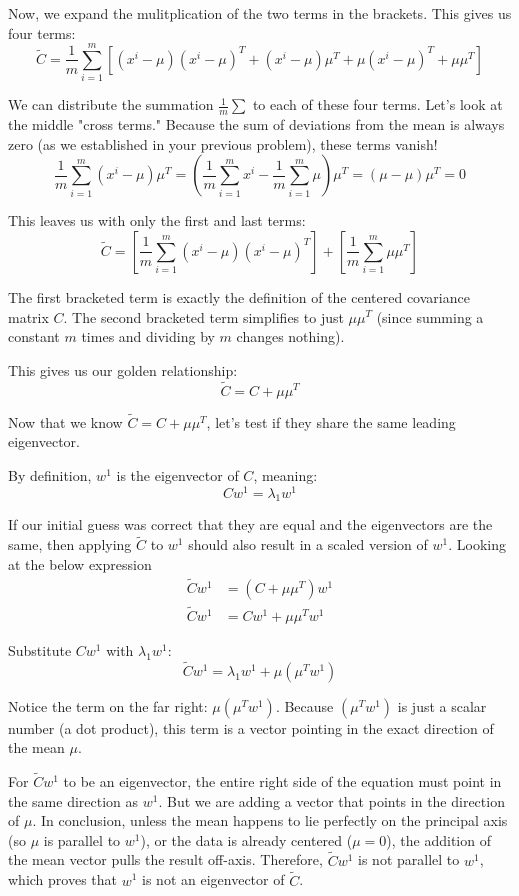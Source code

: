 \documentclass[twoside, 10pt]{article}
\begin{document}
Now, we expand the mulitplication of the two terms in the brackets. This gives us four terms:
\[ \tilde{C} = \frac{1}{m} \sum_{i=1}^m \left[ (x^i - \mu)(x^i - \mu)^T + (x^i - \mu)\mu^T + \mu(x^i - \mu)^T + \mu\mu^T \right] \]

We can distribute the summation $\frac{1}{m} \sum$ to each of these four terms. Let's look at the middle "cross terms." Because the sum of deviations from the mean is always zero (as we established in your previous problem), these terms vanish!
\[ \frac{1}{m} \sum_{i=1}^m (x^i - \mu)\mu^T = \left( \frac{1}{m} \sum_{i=1}^m x^i - \frac{1}{m} \sum_{i=1}^m \mu \right) \mu^T = (\mu - \mu)\mu^T = 0 \]

This leaves us with only the first and last terms:
\[ \tilde{C} = \left[ \frac{1}{m} \sum_{i=1}^m (x^i - \mu)(x^i - \mu)^T \right] + \left[ \frac{1}{m} \sum_{i=1}^m \mu\mu^T \right] \]

The first bracketed term is exactly the definition of the centered covariance matrix $C$. The second bracketed term simplifies to just $\mu\mu^T$ (since summing a constant $m$ times and dividing by $m$ changes nothing).

This gives us our golden relationship:
\[ \tilde{C} = C + \mu\mu^T \]

Now that we know $\tilde{C} = C + \mu\mu^T$, let's test if they share the same leading eigenvector. 

By definition, $w^1$ is the eigenvector of $C$, meaning:
\[ C w^1 = \lambda_1 w^1 \]

If our initial guess was correct that they are equal and the eigenvectors are the same, then applying $\tilde{C}$ to $w^1$ should also result in a scaled version of $w^1$. Looking at the below expression
\begin{align*}
\tilde{C} w^1 &= (C + \mu\mu^T) w^1 \\
\tilde{C} w^1 &= C w^1 + \mu\mu^T w^1
\end{align*}

Substitute $C w^1$ with $\lambda_1 w^1$:
\[ \tilde{C} w^1 = \lambda_1 w^1 + \mu(\mu^T w^1) \]

Notice the term on the far right: $\mu(\mu^T w^1)$. Because $(\mu^T w^1)$ is just a scalar number (a dot product), this term is a vector pointing in the exact direction of the mean $\mu$. 

For $\tilde{C} w^1$ to be an eigenvector, the entire right side of the equation must point in the same direction as $w^1$. But we are adding a vector that points in the direction of $\mu$. 
In conclusion, unless the mean happens to lie perfectly on the principal axis (so $\mu$ is parallel to $w^1$), or the data is already centered ($\mu = 0$), the addition of the mean vector pulls the result off-axis. Therefore, $\tilde{C} w^1$ is not parallel to $w^1$, which proves that $w^1$ is not an eigenvector of $\tilde{C}$.
\end{document}
